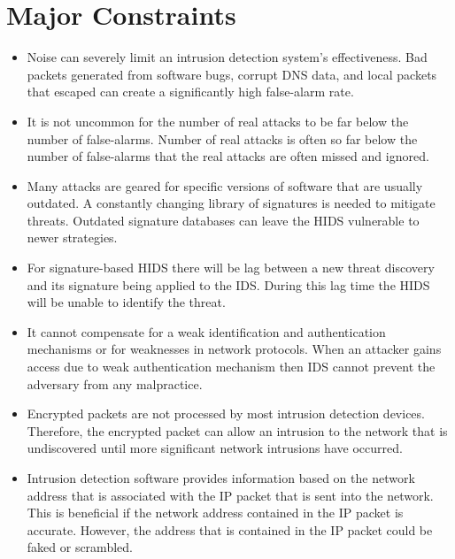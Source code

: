 \documentclass[12pt,a4paper]{report}
\begin{document}
\section{Major Constraints} 
\begin{itemize}
\item	Noise can severely limit an intrusion detection system's effectiveness. Bad packets generated from software bugs, corrupt DNS data, and local packets that escaped can create a significantly high false-alarm rate. 
\item	It is not uncommon for the number of real attacks to be far below the number of false-alarms. Number of real attacks is often so far below the number of false-alarms that the real attacks are often missed and ignored.
\item	 Many attacks are geared for specific versions of software that are usually outdated. A constantly changing library of signatures is needed to mitigate threats. Outdated signature databases can leave the HIDS vulnerable to newer strategies.
\item	 For signature-based HIDS there will be lag between a new threat discovery and its signature being applied to the IDS. During this lag time the HIDS will be unable to identify the threat. 
\item	It cannot compensate for a weak identification and authentication mechanisms or for weaknesses in network protocols. When an attacker gains access due to weak authentication mechanism then IDS cannot prevent the adversary from any malpractice.
\item	Encrypted packets are not processed by most intrusion detection devices. Therefore, the encrypted packet can allow an intrusion to the network that is undiscovered until more significant network intrusions have occurred.
\item	Intrusion detection software provides information based on the network address that is associated with the IP packet that is sent into the network. This is beneficial if the network address contained in the IP packet is accurate. However, the address that is contained in the IP packet could be faked or scrambled.
\end{itemize}
\end{document}
